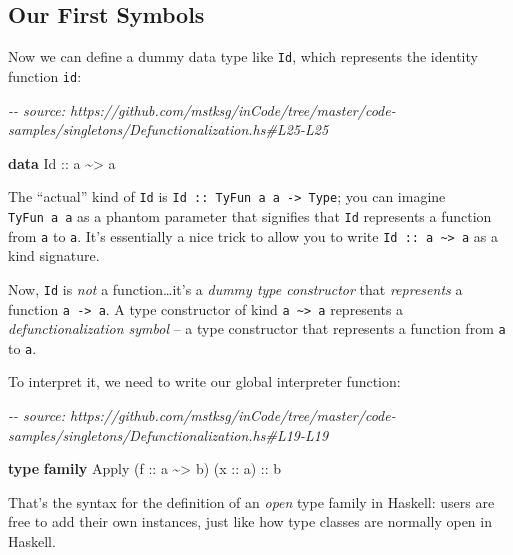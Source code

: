 \documentclass[]{article}
\newenvironment{Shaded}{}{}
\newcommand{\CommentTok}[1]{\textcolor[rgb]{0.38,0.63,0.69}{\textit{#1}}}
\newcommand{\DataTypeTok}[1]{\textcolor[rgb]{0.56,0.13,0.00}{#1}}
\newcommand{\KeywordTok}[1]{\textcolor[rgb]{0.00,0.44,0.13}{\textbf{#1}}}
\newcommand{\NormalTok}[1]{#1}
\newcommand{\OperatorTok}[1]{\textcolor[rgb]{0.40,0.40,0.40}{#1}}
\newcommand{\OtherTok}[1]{\textcolor[rgb]{0.00,0.44,0.13}{#1}}
\begin{document}
\subsection{Our First Symbols}\label{our-first-symbols}

Now we can define a dummy data type like \texttt{Id}, which represents the
identity function \texttt{id}:

\begin{Shaded}
\begin{Highlighting}[]
\CommentTok{{-}{-} source: https://github.com/mstksg/inCode/tree/master/code{-}samples/singletons/Defunctionalization.hs\#L25{-}L25}

\KeywordTok{data} \DataTypeTok{Id}\OtherTok{ ::}\NormalTok{ a }\OperatorTok{\textasciitilde{}\textgreater{}}\NormalTok{ a}
\end{Highlighting}
\end{Shaded}

The ``actual'' kind of \texttt{Id} is
\texttt{Id\ ::\ TyFun\ a\ a\ -\textgreater{}\ Type}; you can imagine
\texttt{TyFun\ a\ a} as a phantom parameter that signifies that \texttt{Id}
represents a function from \texttt{a} to \texttt{a}. It's essentially a nice
trick to allow you to write
\texttt{Id\ ::\ a\ \textasciitilde{}\textgreater{}\ a} as a kind signature.

Now, \texttt{Id} is \emph{not} a function\ldots it's a \emph{dummy type
constructor} that \emph{represents} a function \texttt{a\ -\textgreater{}\ a}. A
type constructor of kind \texttt{a\ \textasciitilde{}\textgreater{}\ a}
represents a \emph{defunctionalization symbol} -- a type constructor that
represents a function from \texttt{a} to \texttt{a}.

To interpret it, we need to write our global interpreter function:

\begin{Shaded}
\begin{Highlighting}[]
\CommentTok{{-}{-} source: https://github.com/mstksg/inCode/tree/master/code{-}samples/singletons/Defunctionalization.hs\#L19{-}L19}

\KeywordTok{type} \KeywordTok{family} \DataTypeTok{Apply}\NormalTok{ (}\OtherTok{f ::}\NormalTok{ a }\OperatorTok{\textasciitilde{}\textgreater{}}\NormalTok{ b) (}\OtherTok{x ::}\NormalTok{ a)}\OtherTok{ ::}\NormalTok{ b}
\end{Highlighting}
\end{Shaded}

That's the syntax for the definition of an \emph{open} type family in Haskell:
users are free to add their own instances, just like how type classes are
normally open in Haskell.
\end{document}
